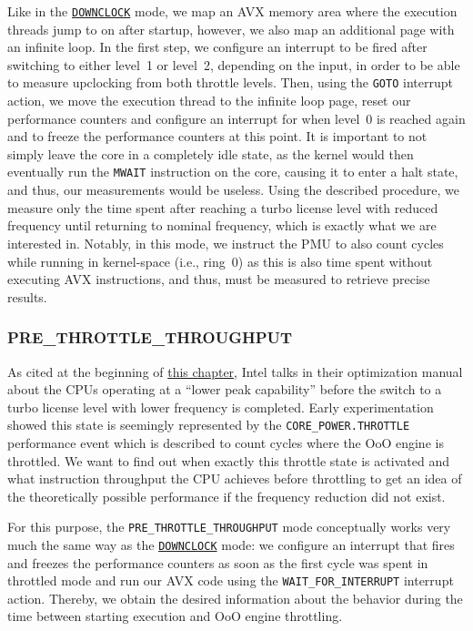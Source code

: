 Like in the \hyperref[sec:analysis:design:measurementmodes:downclock]{\texttt{DOWNCLOCK}} mode, we map an \gls{AVX} memory area where the execution threads jump to on after startup, however, we also map an additional page with an infinite loop. In the first step, we configure an interrupt to be fired after switching to either level~1 or level~2, depending on the input, in order to be able to measure upclocking from both throttle levels. Then, using the \texttt{GOTO} interrupt action, we move the execution thread to the infinite loop page, reset our performance counters and configure an interrupt for when level~0 is reached again and to freeze the performance counters at this point. It is important to not simply leave the core in a completely idle state, as the kernel would then eventually run the \texttt{MWAIT} \cite{intelsdminstructionreference} instruction on the core, causing it to enter a halt state, and thus, our measurements would be useless. Using the described procedure, we measure only the time spent after reaching a turbo license level with reduced frequency until returning to nominal frequency, which is exactly what we are interested in. Notably, in this mode, we instruct the \gls{PMU} to also count cycles while running in kernel-space (i.e., ring~$0$) as this is also time spent without executing \gls{AVX} instructions, and thus, must be measured to retrieve precise results.

\subsubsection{PRE\_THROTTLE\_THROUGHPUT}
\label{sec:analysis:design:measurementmodes:prethrottlethroughput}

As cited at the beginning of \hyperref[sec:analysis]{this chapter}, Intel talks in their optimization manual \cite{inteloptimizationmanual} about the \glspl{CPU} operating at a \enquote{lower peak capability} before the switch to a turbo license level with lower frequency is completed. Early experimentation showed this state is seemingly represented by the \texttt{CORE\_POWER.THROTTLE} performance event which is described \cite{intelsdmsysprogguide} to count cycles where the \gls{OoO} engine is throttled. We want to find out when exactly this throttle state is activated and what instruction throughput the \gls{CPU} achieves before throttling to get an idea of the theoretically possible performance if the frequency reduction did not exist.

For this purpose, the \texttt{PRE\_THROTTLE\_THROUGHPUT} mode conceptually works very much the same way as the \hyperref[sec:analysis:design:measurementmodes:downclock]{\texttt{DOWNCLOCK}} mode: we configure an interrupt that fires and freezes the performance counters as soon as the first cycle was spent in throttled mode and run our \gls{AVX} code using the \texttt{WAIT\_FOR\_INTERRUPT} interrupt action. Thereby, we obtain the desired information about the behavior during the time between starting execution and \gls{OoO} engine throttling.

